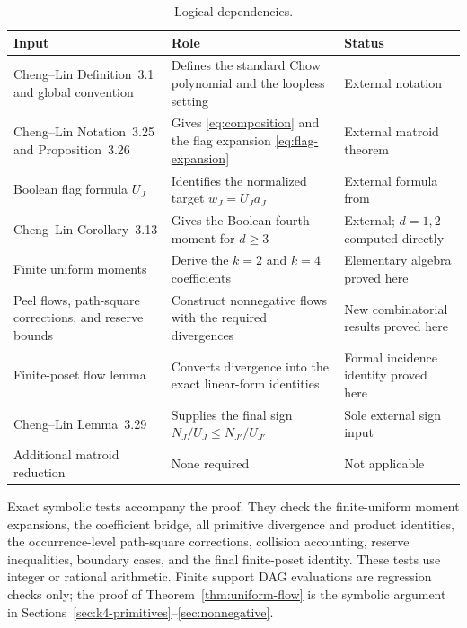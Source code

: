 \documentclass[11pt]{amsart}
\theoremstyle{definition}
\theoremstyle{remark}
\begin{document}
\begin{table}[ht]
\caption{Logical dependencies.}
\label{tab:dependencies}
\small
\begin{tabularx}{\textwidth}{@{}
  >{\raggedright\arraybackslash}p{}
  >{\raggedright\arraybackslash}X
  >{\raggedright\arraybackslash}p{}@{}}
\toprule
Input & Role & Status \\
\midrule
Cheng--Lin Definition~3.1 and global convention
 & Defines the standard Chow polynomial and the loopless setting
 & External notation \\
Cheng--Lin Notation~3.25 and Proposition~3.26
 & Gives \eqref{eq:composition} and the flag expansion
   \eqref{eq:flag-expansion}
 & External matroid theorem \\
Boolean flag formula $U_J$
 & Identifies the normalized target $w_J=U_Ja_J$
 & External formula from \cite[p.~21]{ChengLin} \\
Cheng--Lin Corollary~3.13
 & Gives the Boolean fourth moment for $d\ge3$
 & External; $d=1,2$ computed directly \\
Finite uniform moments
 & Derive the $k=2$ and $k=4$ coefficients
 & Elementary algebra proved here \\
Peel flows, path-square corrections, and reserve bounds
 & Construct nonnegative flows with the required divergences
 & New combinatorial results proved here \\
Finite-poset flow lemma
 & Converts divergence into the exact linear-form identities
 & Formal incidence identity proved here \\
Cheng--Lin Lemma~3.29
 & Supplies the final sign $N_J/U_J\le N_{J'}/U_{J'}$
 & Sole external sign input \\
Additional matroid reduction
 & None required
 & Not applicable \\
\bottomrule
\end{tabularx}
\end{table}

Exact symbolic tests accompany the proof.  They check the finite-uniform
moment expansions, the coefficient bridge, all primitive divergence and
product identities, the occurrence-level path-square corrections, collision
accounting, reserve inequalities, boundary cases, and the final finite-poset
identity.  These tests use integer or rational arithmetic.  Finite support
DAG evaluations are regression checks only; the proof of
Theorem~\ref{thm:uniform-flow} is the symbolic argument in
Sections~\ref{sec:k4-primitives}--\ref{sec:nonnegative}.
\end{document}
